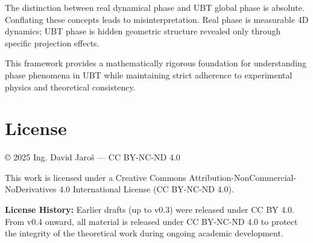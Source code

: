 \documentclass[12pt]{article}
\begin{document}
The distinction between real dynamical phase and UBT global phase is absolute. Conflating these concepts leads to misinterpretation. Real phase is measurable 4D dynamics; UBT phase is hidden geometric structure revealed only through specific projection effects.

This framework provides a mathematically rigorous foundation for understanding phase phenomena in UBT while maintaining strict adherence to experimental physics and theoretical consistency.

\section*{License}
© 2025 Ing. David Jaroš — CC BY-NC-ND 4.0

This work is licensed under a Creative Commons Attribution-NonCommercial-NoDerivatives 4.0 International License (CC BY-NC-ND 4.0).

\textbf{License History:} Earlier drafts (up to v0.3) were released under CC BY 4.0. From v0.4 onward, all material is released under CC BY-NC-ND 4.0 to protect the integrity of the theoretical work during ongoing academic development.
\end{document}
